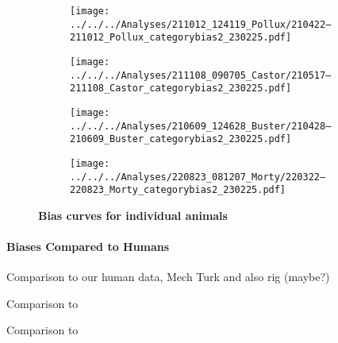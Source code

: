 \begin{figure}
    \centering
    \begin{subfigure}[b]{0.49\textwidth}
         \centering
         \caption{}
         \texttt{[image: ../../../Analyses/211012\_124119\_Pollux/210422--211012\_Pollux\_categorybias2\_230225.pdf]}
         \label{fig:BiasCurvesPollux}
    \end{subfigure}
    \hfill
    \begin{subfigure}[b]{0.49\textwidth}
         \centering
         \caption{}
         \texttt{[image: ../../../Analyses/211108\_090705\_Castor/210517--211108\_Castor\_categorybias2\_230225.pdf]}    
         \label{fig:BiasCurvesCastor}
    \end{subfigure}
    
    \begin{subfigure}[b]{0.49\textwidth}
         \centering
         \caption{}
         \texttt{[image: ../../../Analyses/210609\_124628\_Buster/210428--210609\_Buster\_categorybias2\_230225.pdf]}    
         \label{fig:BiasCurvesBuster}
     \end{subfigure}
     \hfill
     \begin{subfigure}[b]{0.49\textwidth}
         \centering
         \caption{}
         \texttt{[image: ../../../Analyses/220823\_081207\_Morty/220322--220823\_Morty\_categorybias2\_230225.pdf]}    
         \label{fig:BiasCurvesMorty}
     \end{subfigure}
        \caption{\textbf{Bias curves for individual animals} }
        \label{fig:BiasCurvesIndividual}
\end{figure}



\paragraph{Biases Compared to Humans}

Comparison to our human data, Mech Turk and also rig (maybe?)

Comparison to \cite{bae_why_2015}

Comparison to \cite{panichello_error-correcting_2019}

